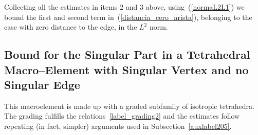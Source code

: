 Collecting all the estimates in items $2$ and $3$ above, using~(\ref{normaL2L1})
we bound the first and second term in~(\ref{distancia_cero_arista}), 
belonging to the case with zero distance
to the edge, in the $L^2$ norm.

\subsection{Bound for the Singular Part in a Tetrahedral Macro--Element
with Singular Vertex and no Singular Edge}
This macroelement is made up with a graded subfamily of isotropic tetrahedra.
The grading fulfills the relations~\eqref{label_grading2} and the estimates
follow repeating (in fact, simpler) arguments used in Subsection~\ref{auxlabel205}.  
